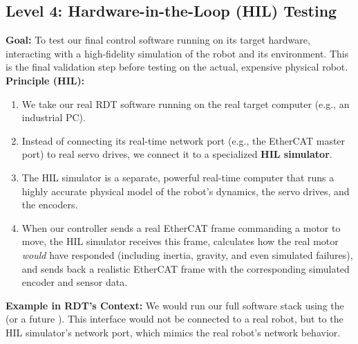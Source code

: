 
\subsection*{Level 4: Hardware-in-the-Loop (HIL) Testing}
\label{subsec:hil_testing}

\textbf{Goal:} To test our final control software running on its target hardware, interacting with a high-fidelity simulation of the robot and its environment. This is the final validation step before testing on the actual, expensive physical robot.\\
\textbf{Principle (HIL):}
        \begin{enumerate}
            \item We take our real RDT software running on the real target computer (e.g., an industrial PC).
            \item Instead of connecting its real-time network port (e.g., the EtherCAT master port) to real servo drives, we connect it to a specialized \textbf{HIL simulator}.
            \item The HIL simulator is a separate, powerful real-time computer that runs a highly accurate physical model of the robot's dynamics, the servo drives, and the encoders.
            \item When our controller sends a real EtherCAT frame commanding a motor to move, the HIL simulator receives this frame, calculates how the real motor \textit{would} have responded (including inertia, gravity, and even simulated failures), and sends back a realistic EtherCAT frame with the corresponding simulated encoder and sensor data.
        \end{enumerate}
\textbf{Example in RDT's Context:} We would run our full software stack using the  (or a future ). This interface would not be connected to a real robot, but to the HIL simulator's network port, which mimics the real robot's network behavior.\\

